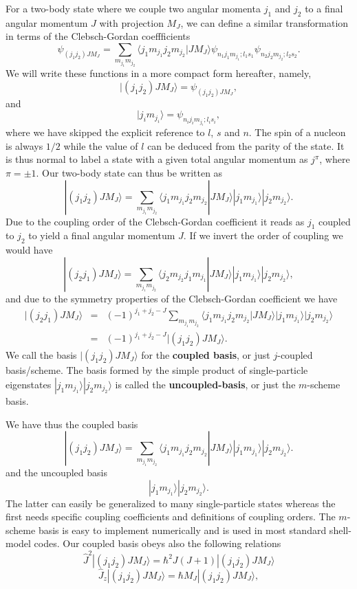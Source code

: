 \documentclass[graybox,sectrefs,envcountresetchap,open=right]{svmonodo}
\begin{document}
For a two-body state where we couple two angular momenta $j_1$ and $j_2$ to a final
angular momentum $J$ with projection $M_J$, we can define a similar transformation in terms
of the Clebsch-Gordan coeffficients
\[
\psi_{(j_1j_2)JM_J}=\sum_{m_{j_1}m_{j_2}}\langle j_1m_{j_1}j_2m_{j_2}|JM_J\rangle\psi_{n_1j_1m_{j_1};l_1s_1}\psi_{n_2j_2m_{j_2};l_2s_2}.
\]
We will write these functions in a more compact form hereafter, namely,
\[
|(j_1j_2)JM_J\rangle=\psi_{(j_1j_2)JM_J},
\]
and
\[
|j_im_{j_i}\rangle=\psi_{n_ij_im_{j_i};l_is_i},
\]
where we have skipped the explicit reference to $l$, $s$ and $n$. The spin of a nucleon is always $1/2$ while the value of $l$ can be deduced from the parity of the state.
It is thus normal to label a state with a given total angular momentum as 
$j^{\pi}$, where $\pi=\pm 1$. 
Our two-body state can thus be written as 
\[
|(j_1j_2)JM_J\rangle=\sum_{m_{j_1}m_{j_2}}\langle j_1m_{j_1}j_2m_{j_2}|JM_J\rangle|j_1m_{j_1}\rangle|j_2m_{j_2}\rangle.
\]
Due to the coupling order of the Clebsch-Gordan coefficient it reads as 
$j_1$ coupled to $j_2$ to yield a final angular momentum $J$. If we invert the order of coupling we would have
\[
|(j_2j_1)JM_J\rangle=\sum_{m_{j_1}m_{j_2}}\langle j_2m_{j_2}j_1m_{j_1}|JM_J\rangle|j_1m_{j_1}\rangle|j_2m_{j_2}\rangle,
\]
and due to the symmetry properties of the Clebsch-Gordan coefficient we have
\begin{eqnarray*}
|(j_2j_1)JM_J\rangle & = & (-1)^{j_1+j_2-J}\sum_{m_{j_1}m_{j_2}}\langle j_1m_{j_1}j_2m_{j_2}|JM_J\rangle|j_1m_{j_1}\rangle|j_2m_{j_2}\rangle \\
& = & (-1)^{j_1+j_2-J}|(j_1j_2)JM_J\rangle.
\end{eqnarray*}
We call the basis $|(j_1j_2)JM_J\rangle$ for the \textbf{coupled basis}, or just $j$-coupled basis/scheme. The basis formed by the simple product of single-particle eigenstates 
$|j_1m_{j_1}\rangle|j_2m_{j_2}\rangle$ is called the \textbf{uncoupled-basis}, or just the $m$-scheme basis. 

\noindent
We have thus the coupled basis 
\[
|(j_1j_2)JM_J\rangle=\sum_{m_{j_1}m_{j_2}}\langle j_1m_{j_1}j_2m_{j_2}|JM_J\rangle|j_1m_{j_1}\rangle|j_2m_{j_2}\rangle.
\]
and the uncoupled basis 
\[
|j_1m_{j_1}\rangle|j_2m_{j_2}\rangle.
\]
The latter can easily be generalized to many single-particle states whereas the first 
needs specific coupling coefficients and definitions of coupling orders. 
The $m$-scheme basis is easy to implement numerically and is used in most standard shell-model codes. 
Our coupled basis obeys also the following relations
\[
   \hat{J}^2|(j_1j_2)JM_J\rangle=\hbar^2J(J+1)|(j_1j_2)JM_J\rangle
\]
\[
   \hat{J}_z|(j_1j_2)JM_J\rangle=\hbar M_J|(j_1j_2)JM_J\rangle,
\]
\end{document}
